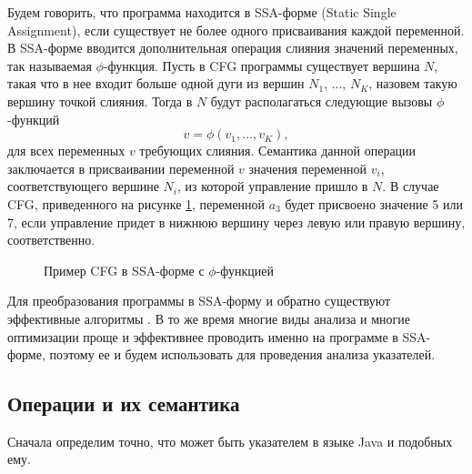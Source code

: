 \documentclass[14pt,titlepage]{extarticle}
\newcommand{\eng}[1]{{\English#1}}
\begin{document}
      Будем говорить, что программа находится в SSA-форме (\eng{Static Single
      Assignment}), если существует не более одного присваивания каждой
      переменной. В SSA-форме вводится дополнительная операция слияния значений
      переменных, так называемая $\phi$-функция. Пусть в CFG программы
      существует вершина $N$, такая что в нее входит больше одной дуги из
      вершин $N_1$, ..., $N_K$, назовем такую вершину точкой слияния. Тогда в
      $N$ будут располагаться следующие вызовы $\phi$-функций
      \[ v = \phi(v_1, ..., v_K), \]
      для всех переменных $v$ требующих слияния.
      Семантика данной операции заключается в присваивании переменной $v$
      значения переменной $v_i$, соответствующего вершине $N_i$, из которой
      управление пришло в $N$. В случае CFG, приведенного на рисунке
      \ref{fig:cfg_with_phi}, переменной $a_3$ будет присвоено значение 5 или
      7, если управление придет в нижнюю вершину через левую или правую
      вершину, соответственно.

      \begin{figure}[!htb]
        \caption{Пример CFG в SSA-форме с $\phi$-функцией}
        \label{fig:cfg_with_phi}
      \end{figure}

      Для преобразования программы в SSA-форму и обратно существуют эффективные
      алгоритмы \cite{ssa}. В то же время
      многие виды анализа и многие оптимизации проще и эффективнее проводить
      именно на программе в SSA-форме, поэтому ее и
      будем использовать для проведения анализа указателей.

    \subsection{Операции и их семантика}
      \label{section:instructions}

      Сначала определим точно, что может быть указателем в языке Java и
      подобных ему.
\end{document}
